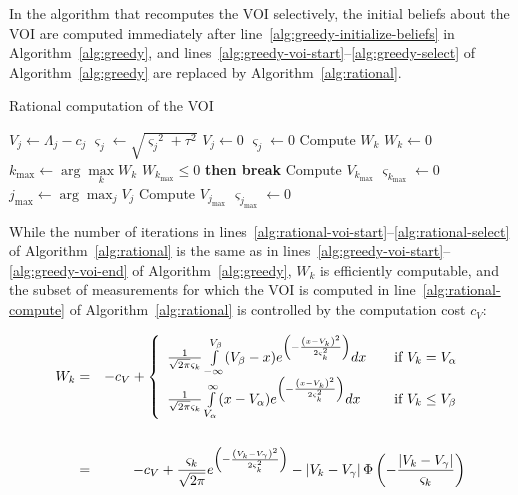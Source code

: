 In the algorithm that recomputes the VOI
selectively, the initial beliefs about the VOI
are computed immediately after line~\ref{alg:greedy-initialize-beliefs} in
Algorithm~\ref{alg:greedy}, and lines~\ref{alg:greedy-voi-start}--\ref{alg:greedy-select} of
Algorithm~\ref{alg:greedy} are replaced by Algorithm~\ref{alg:rational}.
\begin{algorithm}[t]
\caption{Rational computation of the VOI}
\label{alg:rational}
\begin{algorithmic}[1]
       \State $V_j\leftarrow \Lambda_j-c_j$
       \State $\varsigma_j \leftarrow \sqrt {{\varsigma_j}^2+\tau^2}$
     \Else
       \State $V_j \leftarrow 0$
       \State $\varsigma_j \leftarrow 0$
     \EndIf
  \EndFor
  \Loop
                                \label{alg:rational-voi-start}
         \State Compute $W_k$ \quad {}
       \Else 
         \State $W_k \leftarrow 0$
       \EndIf
    \EndFor                                                 \label{alg:rational-voi-end}
    \State $k_{\max} \leftarrow \arg \max\limits_k W_k$       \label{alg:rational-select}
     {$W_{k_{\max}} \le 0$} {\bf then break}
    \State Compute $V_{k_{\max}}$                             \label{alg:rational-compute}
    \State $\varsigma_{k_{\max}} \leftarrow 0$                 
  \EndLoop
  \State $j_{\max} \leftarrow \arg\max_j V_j$
  \State Compute $V_{j_{\max}}$                                \label{alg:rational-compute-chosen}
  \State $\varsigma_{j_{\max}} \leftarrow 0$
\end{algorithmic}
\end{algorithm}
While the number of iterations in 
lines~\ref{alg:rational-voi-start}--\ref{alg:rational-select}
of Algorithm~\ref{alg:rational} is the same as in
lines~\ref{alg:greedy-voi-start}--\ref{alg:greedy-voi-end}
of Algorithm~\ref{alg:greedy}, $W_k$ is efficiently computable,
and the subset of measurements for which the VOI is computed in
line~\ref{alg:rational-compute} of Algorithm~\ref{alg:rational} is
controlled by the computation cost $c_V$:

\begin{eqnarray}
\label{eq:rational-w}
W_k&=&-c_V+\left\{
\begin{array}{l l}
\frac 1 {\sqrt {2\pi}\varsigma_k}\int\limits_{-\infty}^{V_\beta}(V_\beta-x)e^{\left(-\frac {\left(x-V_k\right)^2}
         {2\varsigma_k^2}\right)}dx & \quad \mbox{if $V_k=V_\alpha$} \\
\frac 1 {\sqrt {2\pi}\varsigma_k}\int\limits_{V_\alpha}^{\infty}(x-V_\alpha)e^{\left(-\frac {\left(x-V_k\right)^2}
         {2\varsigma_k^2}\right)}dx & \quad \mbox{if $V_k\le V_\beta$}
\end{array} \right. \nonumber \\
&&\nonumber\\
&=&-c_V+ \frac {\varsigma_k} {\sqrt {2\pi}} e^{\left(-\frac {\left(V_k-V_\gamma\right)^2} {2\varsigma_k^2}\right)}-\left|V_k-V_\gamma\right|\Phi\left(-\frac {\left|V_k-V_\gamma\right|} {\varsigma_k} \right)
\end{eqnarray}

